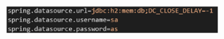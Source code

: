 \documentclass[conference]{IEEEtran}
\begin{document}
\vspace{7mm}
\centerline{\includegraphics[width=80mm,height=600mm,keepaspectratio]{Postegresql.png}}
\vspace{7mm}
\end{document}
